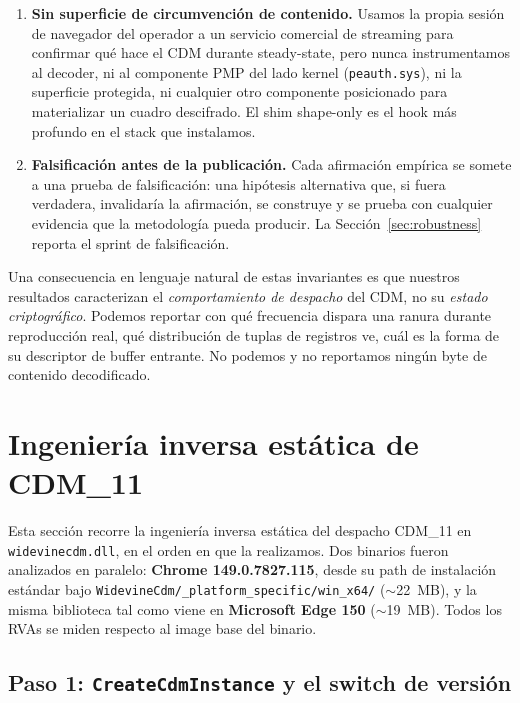 \documentclass[11pt,letterpaper]{article}
\let\oldsection\section
\renewcommand{\section}{\clearpage\oldsection}
\begin{document}
\begin{enumerate}[itemsep=2pt,topsep=2pt]
        shim para que un observador externo pueda validar que el
        estado post-experimento es byte-igual al estado
        pre-experimento.
  \item \textbf{Sin superficie de circumvención de contenido.}
        Usamos la propia sesión de navegador del operador a un
        servicio comercial de streaming para confirmar qué hace
        el CDM durante steady-state, pero nunca instrumentamos al
        decoder, ni al componente PMP del lado kernel
        (\texttt{peauth.sys}), ni la superficie protegida, ni
        cualquier otro componente posicionado para materializar
        un cuadro descifrado. El shim shape-only es el hook más
        profundo en el stack que instalamos.
  \item \textbf{Falsificación antes de la publicación.} Cada
        afirmación empírica se somete a una prueba de
        falsificación: una hipótesis alternativa que, si fuera
        verdadera, invalidaría la afirmación, se construye y se
        prueba con cualquier evidencia que la metodología pueda
        producir. La Sección~\ref{sec:robustness} reporta el
        sprint de falsificación.
\end{enumerate}

Una consecuencia en lenguaje natural de estas invariantes es que
nuestros resultados caracterizan el \emph{comportamiento de
despacho} del CDM, no su \emph{estado criptográfico}. Podemos
reportar con qué frecuencia dispara una ranura durante reproducción
real, qué distribución de tuplas de registros ve, cuál es la forma
de su descriptor de buffer entrante. No podemos y no reportamos
ningún byte de contenido decodificado.

\section{Ingeniería inversa estática de CDM\_11}
\label{sec:static}

Esta sección recorre la ingeniería inversa estática del despacho
CDM\_11 en \texttt{widevinecdm.dll}, en el orden en que la
realizamos. Dos binarios fueron analizados en paralelo:
\textbf{Chrome 149.0.7827.115}, desde su path de instalación
estándar bajo \texttt{WidevineCdm/\_platform\_specific/win\_x64/}
($\sim$22~MB), y la misma biblioteca tal como viene en
\textbf{Microsoft Edge 150} ($\sim$19~MB). Todos los RVAs se
miden respecto al image base del binario.

\subsection{Paso 1: \texttt{CreateCdmInstance} y el switch de versión}
\label{sec:static-export}
\end{document}
